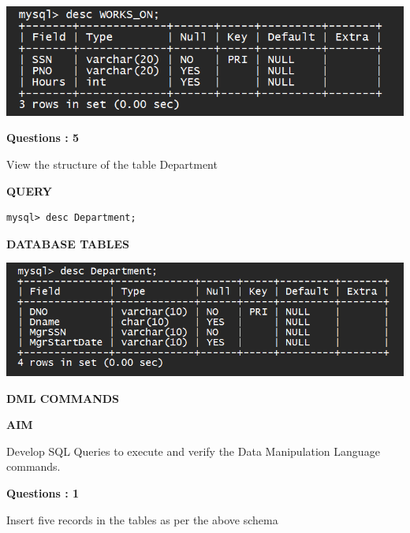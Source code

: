 \documentclass[a4paper,12pt]{report}
\begin{document}
\includegraphics[scale=0.7]{Truncatework.png}
\begin{flushleft}
    \textbf{Questions : 5}
\end{flushleft}
View the structure of the table Department
\begin{flushleft}
		\textbf{QUERY }
	\end{flushleft}
\begin{verbatim}
mysql> desc Department;

\end{verbatim}

\begin{flushleft}
		\textbf{DATABASE TABLES}
\end{flushleft} 

\includegraphics[scale=0.7]{dep.png}

\newpage
\begin{center}
		\large\textbf{DML COMMANDS}
	\end{center}
	
	\begin{flushleft}
		\textbf{AIM }
	\end{flushleft} 
	   Develop SQL Queries to execute and verify the Data Manipulation Language commands.
\begin{flushleft}
    \textbf{Questions : 1}
\end{flushleft}
 Insert five records in the tables as per the above schema
	
\end{document}
